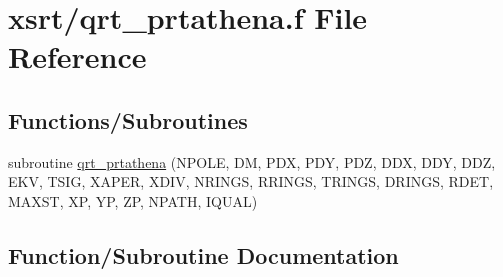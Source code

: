 \hypertarget{qrt__prtathena_8f}{}\section{xsrt/qrt\+\_\+prtathena.f File Reference}
\label{qrt__prtathena_8f}
\subsection*{Functions/\+Subroutines}
\begin{DoxyCompactItemize}
\item 
subroutine \hyperlink{qrt__prtathena_8f_aded25854e297d09895a7802816fa0707}{qrt\+\_\+prtathena} (N\+P\+O\+LE, DM, P\+DX, P\+DY, P\+DZ, D\+DX, D\+DY, D\+DZ, E\+KV, T\+S\+IG, X\+A\+P\+ER, X\+D\+IV, N\+R\+I\+N\+GS, R\+R\+I\+N\+GS, T\+R\+I\+N\+GS, D\+R\+I\+N\+GS, R\+D\+ET, M\+A\+X\+ST, XP, YP, ZP, N\+P\+A\+TH, I\+Q\+U\+AL)
\end{DoxyCompactItemize}


\subsection{Function/\+Subroutine Documentation}
\mbox{\label{qrt__prtathena_8f_aded25854e297d09895a7802816fa0707}} 
